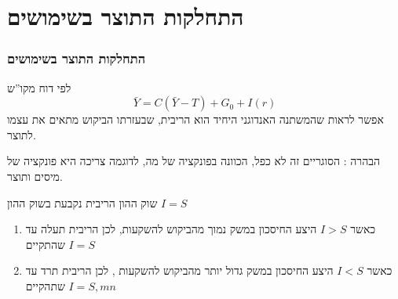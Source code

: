 \documentclass[usenames,dvipsnames]{beamer}
\begin{document}
\begin{RTL}
\begin{frame}[allowframebreaks]
    \end{frame}


    \section{התחלקות התוצר בשימושים}
    \begin{frame}
        \frametitle{התחלקות התוצר בשימושים}
        \begin{block}{לפי דוח מקו''ש}
        $$\bar Y = C(\bar Y - T) + G_0 + I(r)$$  
        אפשר לראות שהמשתנה האנדוגני היחיד הוא הריבית, שבעזרתו הביקוש מתאים את עצמו לתוצר.      
        \end{block}
        הבהרה : הסוגריים זה לא כפל, הכוונה בפונקציה של מה, לדוגמה צריכה היא פונקציה של מיסים ותוצר.
        
        \begin{block}{שוק ההון}
            הריבית נקבעת בשוק ההון $I = S$
            \begin{enumerate}
                \item כאשר $I > S$ היצע החיסכון במשק נמוך מהביקוש להשקעות, לכן הריבית תעלה עד שהתקיים $I = S$
                \item כאשר $I < S$ היצע החיסכון במשק גדול יותר מהביקוש להשקעות , לכן הריבית תרד עד שתהקיים $I = S,mn$
            \end{enumerate}
        \end{block}
        
    
    \end{frame}
\end{RTL}
\end{document}
